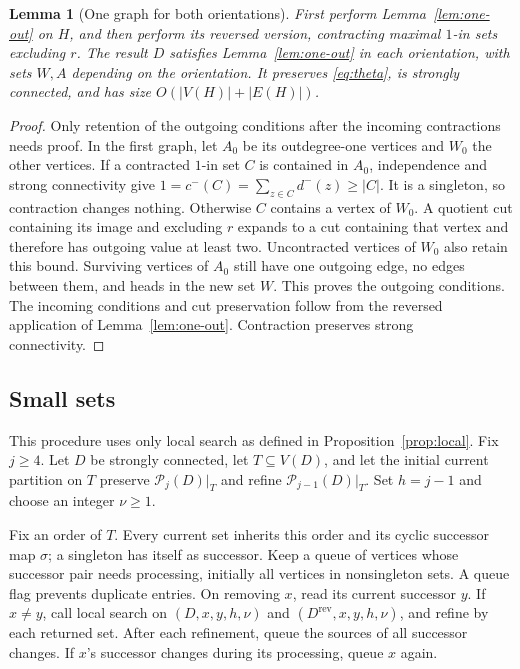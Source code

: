 \documentclass[11pt]{article}
\newtheorem{lemma}[theorem]{Lemma}
\theoremstyle{definition}
\theoremstyle{remark}
\newcommand{\rev}[1]{#1^{\mathrm{rev}}}
\newcommand{\PP}{\mathcal P}
\begin{document}
\begin{lemma}[One graph for both orientations]
\label{lem:two-orientations}
First perform Lemma~\ref{lem:one-out} on \(H\), and then perform its reversed version, contracting maximal \(1\)-in sets excluding \(r\). The result \(D\) satisfies Lemma~\ref{lem:one-out} in each orientation, with sets \(W,A\) depending on the orientation. It preserves \eqref{eq:theta}, is strongly connected, and has size \(O(|V(H)|+|E(H)|)\).
\end{lemma}
\begin{proof}
Only retention of the outgoing conditions after the incoming contractions needs proof. In the first graph, let \(A_0\) be its outdegree-one vertices and \(W_0\) the other vertices. If a contracted \(1\)-in set \(C\) is contained in \(A_0\), independence and strong connectivity give
\(1=c^-(C)=\sum_{z\in C}d^-(z)\ge|C|\).
It is a singleton, so contraction changes nothing. Otherwise \(C\) contains a vertex of \(W_0\). A quotient cut containing its image and excluding \(r\) expands to a cut containing that vertex and therefore has outgoing value at least two. Uncontracted vertices of \(W_0\) also retain this bound. Surviving vertices of \(A_0\) still have one outgoing edge, no edges between them, and heads in the new set \(W\). This proves the outgoing conditions. The incoming conditions and cut preservation follow from the reversed application of Lemma~\ref{lem:one-out}. Contraction preserves strong connectivity.
\end{proof}

\subsection{Small sets}
\label{sec:small}
This procedure uses only local search as defined in Proposition~\ref{prop:local}. Fix \(j\ge4\). Let \(D\) be strongly connected, let \(T\subseteq V(D)\), and let the initial current partition on \(T\) preserve \(\PP_j(D)|_T\) and refine \(\PP_{j-1}(D)|_T\). Set \(h=j-1\) and choose an integer \(\nu\ge1\).

Fix an order of \(T\). Every current set inherits this order and its cyclic successor map \(\sigma\); a singleton has itself as successor. Keep a queue of vertices whose successor pair needs processing, initially all vertices in nonsingleton sets. A queue flag prevents duplicate entries. On removing \(x\), read its current successor \(y\). If \(x\ne y\), call local search on \((D,x,y,h,\nu)\) and \((\rev D,x,y,h,\nu)\), and refine by each returned set. After each refinement, queue the sources of all successor changes. If \(x\)'s successor changes during its processing, queue \(x\) again.
\end{document}
